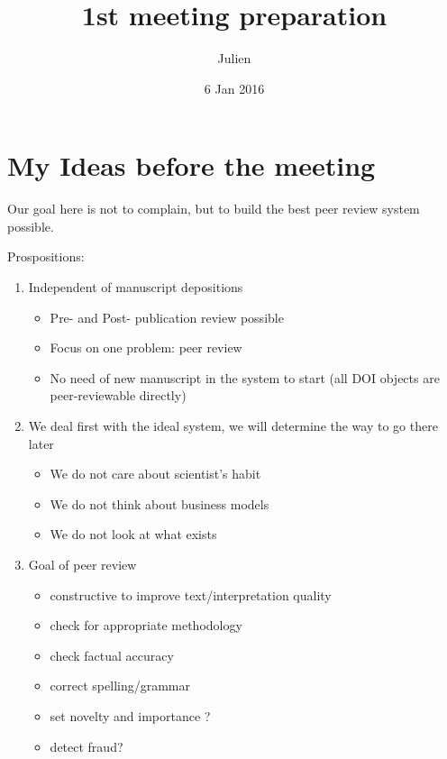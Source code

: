 \documentclass[]{article}
\title{1st meeting preparation}
\author{Julien}
\date{6 Jan 2016}
\begin{document}
\maketitle


{
\hypersetup{linkcolor=black}
\setcounter{tocdepth}{2}
\tableofcontents
}
\section{My Ideas before the meeting}\label{my-ideas-before-the-meeting}

Our goal here is not to complain, but to build the best peer review
system possible.

Prospositions:

\begin{enumerate}
\def\labelenumi{\arabic{enumi}.}
\itemsep1pt\parskip0pt
\item
  Independent of manuscript depositions

  \begin{itemize}
  \itemsep1pt\parskip0pt
  \item
    Pre- and Post- publication review possible
  \item
    Focus on one problem: peer review
  \item
    No need of new manuscript in the system to start (all DOI objects
    are peer-reviewable directly)
  \end{itemize}
\item
  We deal first with the ideal system, we will determine the way to go
  there later

  \begin{itemize}
  \itemsep1pt\parskip0pt
  \item
    We do not care about scientist's habit
  \item
    We do not think about business models
  \item
    We do not look at what exists
  \end{itemize}
\item
  Goal of peer review

  \begin{itemize}
  \itemsep1pt\parskip0pt
  \item
    constructive to improve text/interpretation quality
  \item
    check for appropriate methodology
  \item
    check factual accuracy
  \item
    correct spelling/grammar
  \item
    set novelty and importance ?
  \item
    detect fraud?
  \end{itemize}
\end{enumerate}
\end{document}

